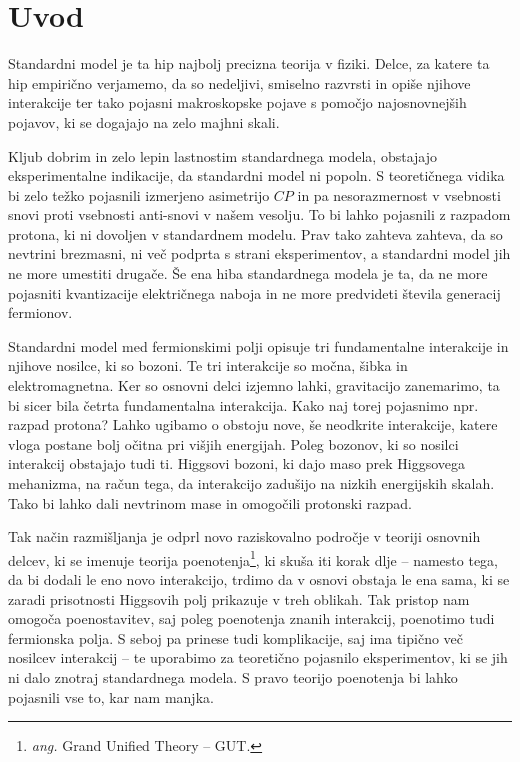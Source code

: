 \chapter{Uvod}

Standardni model je ta hip najbolj precizna teorija v fiziki. Delce, za katere ta hip empirično
verjamemo, da so nedeljivi, smiselno razvrsti in opiše njihove interakcije ter tako pojasni
makroskopske pojave s pomočjo najosnovnejših pojavov, ki se dogajajo na zelo majhni skali.

Kljub dobrim in zelo lepin lastnostim standardnega modela, obstajajo eksperimentalne indikacije, da
standardni model ni popoln. S teoretičnega vidika bi zelo težko pojasnili izmerjeno asimetrijo $CP$
in pa nesorazmernost v vsebnosti snovi proti vsebnosti anti-snovi v našem vesolju. To bi lahko pojasnili
z razpadom protona, ki ni dovoljen v standardnem modelu. Prav tako zahteva zahteva, da so nevtrini
brezmasni, ni več podprta s strani eksperimentov, a standardni model jih ne more umestiti drugače.
Še ena hiba standardnega modela je ta, da ne more pojasniti kvantizacije električnega naboja in ne more
predvideti števila generacij fermionov.

Standardni model med fermionskimi polji opisuje tri fundamentalne interakcije in njihove nosilce, ki so
bozoni. Te tri interakcije so močna, šibka in elektromagnetna. Ker so osnovni delci izjemno lahki,
gravitacijo zanemarimo, ta bi sicer bila četrta fundamentalna interakcija. Kako naj torej pojasnimo
npr. razpad protona? Lahko ugibamo o obstoju nove, še neodkrite interakcije, katere vloga postane
bolj očitna pri višjih energijah. Poleg bozonov, ki so nosilci interakcij obstajajo tudi ti. Higgsovi
bozoni, ki dajo maso prek Higgsovega mehanizma, na račun tega, da interakcijo zadušijo na nizkih
energijskih skalah.  Tako bi lahko dali nevtrinom mase in omogočili protonski razpad.

Tak način razmišljanja je odprl novo raziskovalno področje v teoriji osnovnih delcev, ki se imenuje
teorija poenotenja\footnote{\emph{ang.} Grand Unified Theory -- GUT.}, ki skuša iti korak dlje -- namesto
tega, da bi dodali le eno novo interakcijo, trdimo da v osnovi obstaja le ena sama, ki se zaradi
prisotnosti Higgsovih polj prikazuje v treh oblikah. Tak pristop nam omogoča poenostavitev, saj poleg
poenotenja znanih interakcij, poenotimo tudi fermionska polja. S seboj pa prinese tudi komplikacije,
saj ima tipično več nosilcev interakcij -- te uporabimo za teoretično pojasnilo eksperimentov, ki se
jih ni dalo znotraj standardnega modela. S pravo teorijo poenotenja bi lahko pojasnili vse to, kar
nam manjka.

